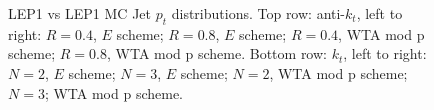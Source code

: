 \begin{figure}[H]
\hfill
{}\hfill
{}\hfill
\caption{LEP1 vs LEP1 MC Jet $p_t$ distributions. Top row: anti-$k_t$, left to right: $R=0.4$, $E$ scheme; $R=0.8$, $E$ scheme; $R=0.4$, WTA mod p scheme; $R=0.8$, WTA mod p scheme. Bottom row: $k_t$, left to right: $N=2$, $E$ scheme; $N=3$, $E$ scheme; $N=2$, WTA mod p scheme; $N=3$; WTA mod p scheme.}  
\end{figure}

